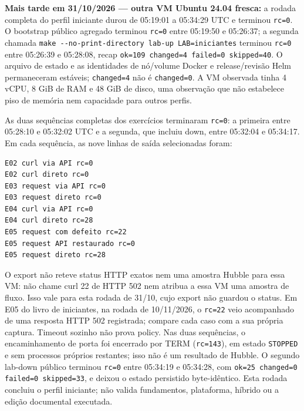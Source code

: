 \documentclass[12pt,openany,oneside,a4paper,chapter=TITLE,english,brazil]{abntex2}
\begin{document}
\begin{apendicesenv}
\textbf{Mais tarde em 31/10/2026 --- outra VM Ubuntu 24.04 fresca:} a rodada completa
do perfil iniciante durou de 05:19:01 a 05:34:29 UTC e terminou \texttt{rc=\allowbreak{}0}.
O bootstrap público agregado terminou \texttt{rc=\allowbreak{}0} entre 05:19:50 e 05:26:37;
a segunda chamada \texttt{make -{}\allowbreak{}-{}\allowbreak{}no-{}\allowbreak{}print-{}\allowbreak{}directory lab-{}\allowbreak{}up LAB=\allowbreak{}iniciantes}
terminou \texttt{rc=\allowbreak{}0} entre 05:26:39 e 05:28:08, recap
\texttt{ok=\allowbreak{}109 changed=\allowbreak{}4 failed=\allowbreak{}0 skipped=\allowbreak{}40}. O arquivo de estado e as identidades de
nó/volume Docker e release/revisão Helm permaneceram estáveis; \texttt{changed=\allowbreak{}4}
não é \texttt{changed=\allowbreak{}0}. A VM observada tinha 4 vCPU, 8 GiB de RAM e 48 GiB de
disco, uma observação que não estabelece piso de memória nem capacidade para
outros perfis.

As duas sequências completas dos exercícios terminaram \texttt{rc=\allowbreak{}0}: a primeira
entre 05:28:10 e 05:32:02 UTC e a segunda, que incluiu down, entre 05:32:04 e
05:34:17. Em cada sequência, as nove linhas de saída selecionadas foram:

\begin{verbatim}
E02 curl via API rc=0
E02 curl direto rc=0
E03 request via API rc=0
E03 request direto rc=0
E04 curl via API rc=0
E04 curl direto rc=28
E05 request com defeito rc=22
E05 request API restaurado rc=0
E05 request direto rc=28
\end{verbatim}

O export não reteve status HTTP exatos nem uma amostra Hubble para essa VM:
não chame curl 22 de HTTP 502 nem atribua a essa VM uma amostra de fluxo. Isso
vale para esta rodada de 31/10, cujo export não guardou o status. Em E05 do
livro de iniciantes, na rodada de 10/11/2026, o \texttt{rc=\allowbreak{}22} veio acompanhado de uma
resposta HTTP 502 registrada; compare cada caso com a sua própria captura.
Timeout sozinho não prova policy. Nas duas
sequências, o encaminhamento de porta foi encerrado por TERM
(\texttt{rc=\allowbreak{}143}), em estado \texttt{STOPPED} e sem processos próprios restantes;
isso não é um resultado de Hubble. O segundo lab-down público terminou
\texttt{rc=\allowbreak{}0} entre 05:34:19 e 05:34:28, com
\texttt{ok=\allowbreak{}25 changed=\allowbreak{}0 failed=\allowbreak{}0 skipped=\allowbreak{}33}, e deixou o estado persistido byte-idêntico.
Esta rodada concluiu o perfil iniciante; não valida fundamentos, plataforma,
híbrido ou a edição documental executada.


\end{apendicesenv}
\end{document}
